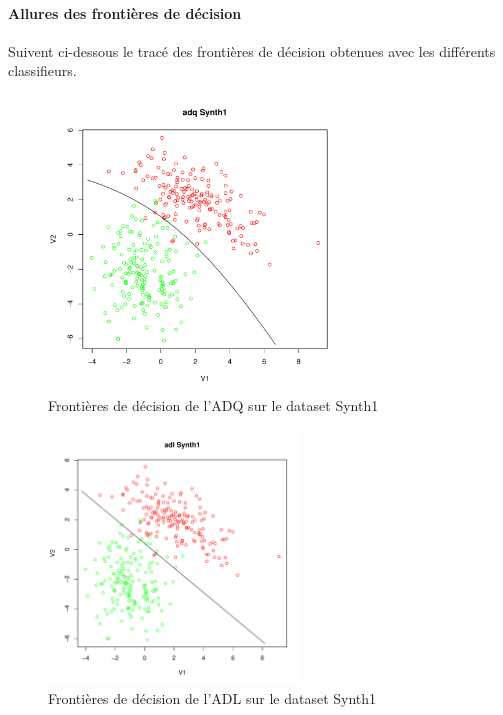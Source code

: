 \documentclass{report}
\begin{document}
\paragraph{Allures des frontières de décision}
Suivent ci-dessous le tracé des frontières de décision obtenues avec les différents classifieurs.

\begin{figure}[ht!]
\begin{center}
    \includegraphics[width=0.7\textwidth]{results/adq/adq-Synth1.pdf}
    \caption{Frontières de décision de l'ADQ sur le dataset Synth1}
\end{center}
\end{figure}

\begin{figure}[ht!]
\begin{center}
    \includegraphics[width=0.6\textwidth]{results/adl/adl-Synth1.pdf}
    \caption{Frontières de décision de l'ADL sur le dataset Synth1}
\end{center}
\end{figure}
\end{document}
